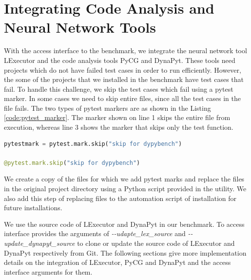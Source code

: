 \section{Integrating Code Analysis and Neural Network Tools}
\label{impl:Integrating Tools}
With the access interface to the benchmark, we integrate the neural network tool LExecutor and the code analysis tools PyCG and DynaPyt.
These tools need projects which do not have failed test cases in order to run efficiently.
However, the some of the projects that we installed in the benchmark have test cases that fail.
To handle this challenge, we skip the test cases which fail using a pytest marker.
In some cases we need to skip entire files, since all the test cases in the file fails.
The two types of pytest markers are as shown in the Listing \ref{code:pytest_marker}.
The marker shown on line 1 skips the entire file from execution, whereas line 3 shows the marker that skips only the test function.
\begin{lstlisting}[caption=Skip Test Case using Pytest Marker,label=code:pytest_marker,language=Python]
pytestmark = pytest.mark.skip("skip for dypybench")

@pytest.mark.skip("skip for dypybench")
\end{lstlisting}

We create a copy of the files for which we add pytest marks and replace the files in the original project directory using a Python script provided in the utility.
We also add this step of replacing files to the automation script of installation for future installations.

We use the source code of LExecutor and DynaPyt in our benchmark.
To access interface provides the arguments of \textit{\--\--udapte\_lex\_source} and \textit{\--\--update\_dynapyt\_source} to clone or update the source code of LExecutor and DynaPyt respectively from Git.
The following sections give more implementation details on the integration of LExecutor, PyCG and DynaPyt and the access interface arguments for them.

